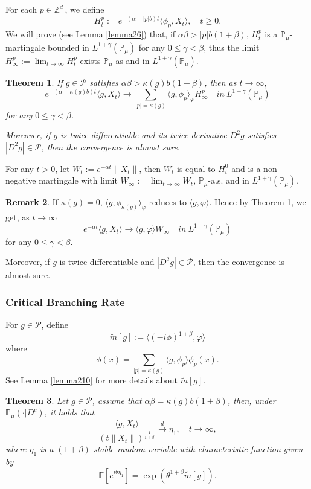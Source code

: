 \documentclass[12pt, a4paper]{amsart}
\newtheorem{thm}{Theorem}[section]
\theoremstyle{definition}
\newtheorem{rem}[thm]{Remark}
\numberwithin{equation}{section}
\begin{document}
For each $p\in \mathbb{Z}_+^d$, we define
$$H_t^p:= e^{-(\alpha-|p|b)t}\langle\phi_p,X_t\rangle,\quad t\geq 0.$$
 We will prove (see Lemma \ref{lemma26}) that, if $\alpha\beta>|p|b(1+\beta)$, $H_t^p$ is a $\mathbb{P}_{\mu}$-martingale bounded in $L^{1+\gamma}(\mathbb{P}_{\mu})$ for any $0\leq\gamma<\beta$, thus the limit $H^p_{\infty}:=\lim_{t\rightarrow \infty}H_t^p$ exists $\mathbb{P}_{\mu}$-as and in $L^{1+\gamma}(\mathbb{P}_{\mu})$.
 \begin{thm}\label{Theorem11}
     If $g \in \mathcal{P}$ satisfies $\alpha\beta>\kappa(g)b(1+\beta)$, then as $t\rightarrow \infty$,
     $$e^{-(\alpha-\kappa(g)b)t}\langle g, X_t\rangle \rightarrow\sum_{|p|=\kappa(g)}\langle g, \phi_p\rangle_{\varphi} H_{\infty}^p \quad in~ L^{1+\gamma}(\mathbb{P}_{\mu})$$
     for any $0\leq\gamma<\beta$.

     Moreover, if $g$ is twice differentiable and its twice derivative $D^2 g$ satisfies $|D^2 g| \in \mathcal{P}$, then the convergence is almost sure.
 \end{thm}
For any $t>0$, let $W_t:=e^{-\alpha t}\|X_t\|$, then $W_t$ is equal to $H_t^0$ and is a non-negative martingale with limit $W_{\infty}:=\lim_{t\rightarrow\infty}W_t$,  $\mathbb{P}_{\mu}$-a.s. and in $L^{1+\gamma}(\mathbb{P}_{\mu})$.
 \begin{rem}
    If $\kappa(g)=0$, $\langle g, \phi_{\kappa(g)}\rangle_{\varphi}$ reduces to $\langle g,\varphi\rangle$. Hence by Theorem \ref{Theorem11}, we get, as $t\rightarrow \infty$
     $$e^{-\alpha t}\langle g, X_t\rangle \rightarrow \langle g, \varphi\rangle W_{\infty} \quad in~ L^{1+\gamma}(\mathbb{P}_{\mu})$$
    for any $0\leq\gamma<\beta$.

    Moreover, if $g$ is twice differentiable and $|D^2 g| \in \mathcal{P}$, then the convergence is almost sure.
 \end{rem}

\subsubsection{Critical Branching Rate}
For $g\in \mathcal{P}$, define
$$\tilde{m}[g]:= \langle(-i\phi)^{1+\beta},\varphi\rangle$$
{\color{red}where}
$$\phi(x)=\sum_{|p|=\kappa(g)}\langle g,\phi_p\rangle\phi_p(x).$$
See Lemma \ref{lemma210} for more details about $\tilde{m}[g]$.
\begin{thm}\label{Theorem12}
Let $g\in\mathcal{P}$, assume that  $\alpha\beta=\kappa(g)b(1+\beta)$, then, under $\mathbb{P}_{\mu}(\cdot|D^c)$, it holds that
$$\frac{\langle g,X_t\rangle}{\left(t\|X_t\|\right)^{\frac{1}{1+\beta}}}\xrightarrow{d} \eta_1, \quad t\rightarrow \infty,$$
where $\eta_1$ is a $(1+\beta)$-stable random variable with characteristic function given by
$$\mathbb{E} [e^{i\theta \eta_1}]=\exp(\theta^{1+\beta}\tilde{m}[g]).$$
\end{thm}
\end{document}
